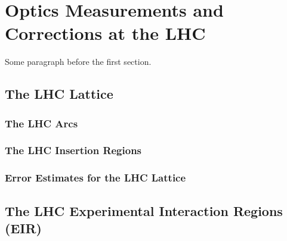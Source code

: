 
\chapter{Optics Measurements and Corrections at the LHC} %

\label{Chapter2} %


Some paragraph before the first section.




\section{The LHC Lattice}


\subsection{The LHC Arcs}

\subsection{The LHC Insertion Regions}

\subsection{Error Estimates for the LHC Lattice}


\section{The LHC Experimental Interaction Regions (EIR)}

